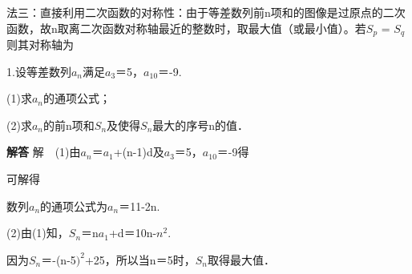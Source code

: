 \qquad{}法三：直接利用二次函数的对称性：由于等差数列前n项和的图像是过原点的二次函数，故n取离二次函数对称轴最近的整数时，取最大值（或最小值）。若\ensuremath{S_{ p}} = \ensuremath{S_{ q}}则其对称轴为\par
{}
\qquad{}1.设等差数列{\ensuremath{a_{n}}}满足\ensuremath{a_{3}}＝5，\ensuremath{a_{10}}＝-9.\par
\qquad{}(1)求{\ensuremath{a_{n}}}的通项公式；\par
\qquad{}(2)求{\ensuremath{a_{n}}}的前n项和\ensuremath{S_{n}}及使得\ensuremath{S_{n}}最大的序号n的值．\par
\QuestionSpace{4.8cm}
\ifshowanswers
\par\begingroup\color{solutioncolor}\noindent\textbf{解答}\quad
\qquad{}解　(1)由\ensuremath{a_{n}}＝\ensuremath{a_{1}}+(n-1)d及\ensuremath{a_{3}}＝5，\ensuremath{a_{10}}＝-9得\par
\qquad{}可解得\par
\qquad{}数列{\ensuremath{a_{n}}}的通项公式为\ensuremath{a_{n}}＝11-2n.\par
\qquad{}(2)由(1)知，\ensuremath{S_{n}}＝n\ensuremath{a_{1}}+d＝10n-\ensuremath{n^{2}}.\par
\qquad{}因为\ensuremath{S_{n}}＝-(n-5\ensuremath{)^{2}}+25，所以当n＝5时，\ensuremath{S_{n}}取得最大值．\par
\par\endgroup\fi

